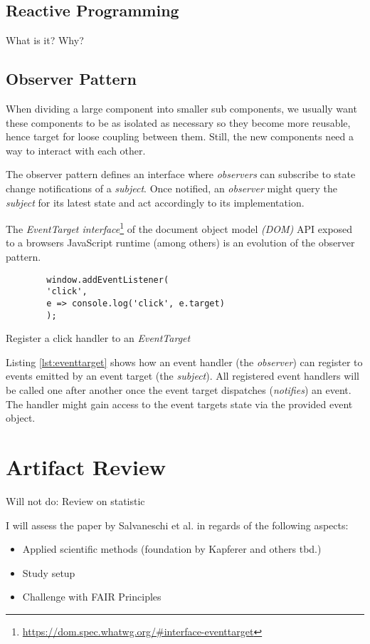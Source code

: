 \documentclass[12pt,a4paper]{article}
\begin{document}
\subsection{Reactive Programming}
What is it? Why?

\subsection{Observer Pattern}
When dividing a large component into smaller sub components, we usually want these components to be as isolated as necessary so they become more reusable, hence target for loose coupling between them. Still, the new components need a way to interact with each other.

The observer pattern \cite{gamma1995design} defines an interface where \emph{observers} can subscribe to state change notifications of a \emph{subject}. Once notified, an \emph{observer} might query the \emph{subject} for its latest state and act accordingly to its implementation.

The \emph{EventTarget interface}\footnote{\url{https://dom.spec.whatwg.org/\#interface-eventtarget}} of the document object model \emph{(DOM)} API exposed to a browsers JavaScript runtime (among others) is an evolution of the observer pattern.

\begin{listing}[H]
	\begin{verbatim}
		window.addEventListener(
		'click',
		e => console.log('click', e.target)
		);
	\end{verbatim}
	\caption{Register a click handler to an \emph{EventTarget}}
	\label{lst:eventtarget}
\end{listing}

Listing \ref{lst:eventtarget} shows how an event handler (the \emph{observer}) can register to events emitted by an event target (the \emph{subject}). All registered event handlers will be called one after another once the event target dispatches (\emph{notifies}) an event. The handler might gain access to the event targets state via the provided event object.


\section{Artifact Review}
Will not do: Review on statistic

I will assess the paper by Salvaneschi et al. \cite{7827078} in regards of the following aspects:
\begin{itemize}
	\item Applied scientific methods (foundation by Kapferer \cite{kapferer:2019:empirical} and others tbd.)
	\item Study setup
	\item Challenge with FAIR Principles \cite{2019arXiv190805986H} \cite{wilkinson:2016}
\end{itemize}
\end{document}
